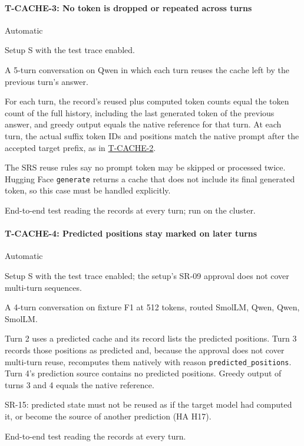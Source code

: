 \documentclass[12pt, titlepage]{article}
\newenvironment{testcase}[2]
  {\Needspace{8\baselineskip}\paragraph{#1: #2}\phantomsection\label{test:#1}\sloppy
   \begin{description}[style=sameline, leftmargin=3.6cm, labelwidth=3.4cm,
     font=\normalfont\bfseries, itemsep=2pt, topsep=2pt]}
  {\end{description}}
\newcommand{\tref}[1]{\hyperref[test:#1]{#1}}
\begin{document}
\begin{testcase}{T-CACHE-3}{No token is dropped or repeated across turns}
\item[Control] Automatic
\item[Initial state] Setup S with the test trace enabled.
\item[Input] A 5-turn conversation on Qwen in which each turn reuses the
cache left by the previous turn's answer.
\item[Output] For each turn, the record's reused plus computed token
counts equal the token count of the full history, including the last
generated token of the previous answer, and greedy output equals the native
reference for that turn. At each turn, the actual suffix token IDs and
positions match the native prompt after the accepted target prefix, as in
\tref{T-CACHE-2}.
\item[Derivation] The SRS reuse rules say no prompt token may be skipped or
processed twice. Hugging Face \texttt{generate} returns a cache that does
not include its final generated token, so this case must be handled
explicitly.
\item[How performed] End-to-end test reading the records at every turn;
run on the cluster.
\end{testcase}

\begin{testcase}{T-CACHE-4}{Predicted positions stay marked on later turns}
\item[Control] Automatic
\item[Initial state] Setup S with the test trace enabled; the setup's SR-09
approval does not cover multi-turn sequences.
\item[Input] A 4-turn conversation on fixture F1 at 512 tokens, routed
SmolLM, Qwen, Qwen, SmolLM.
\item[Output] Turn 2 uses a predicted cache and its record lists the
predicted positions. Turn 3 records those positions as predicted and, because
the approval does not cover multi-turn reuse, recomputes them natively with
reason \texttt{predicted\_positions}. Turn 4's prediction source contains no
predicted positions. Greedy output of turns 3 and 4 equals the native
reference.
\item[Derivation] SR-15: predicted state must not be reused as if the target
model had computed it, or become the source of another prediction (HA H17).
\item[How performed] End-to-end test reading the records at every turn.
\end{testcase}
\end{document}
